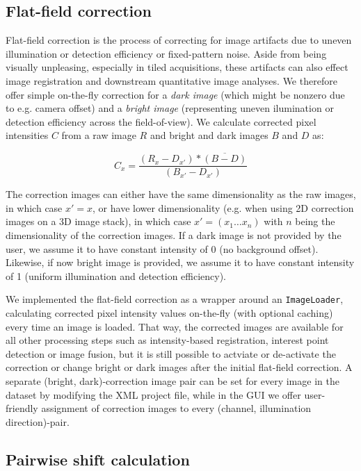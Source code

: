 \subsection{Flat-field correction}

Flat-field correction is the process of correcting for image artifacts due to uneven illumination or detection efficiency or fixed-pattern noise. Aside from being visually unpleasing, especially in tiled acquisitions, these artifacts can also effect image registration and downstream quantitative image analyses. We therefore offer simple on-the-fly correction for a \emph{dark image} (which might be nonzero due to e.g. camera offset) and a \emph{bright image} (representing uneven ilumination or detection efficiency across the field-of-view). We calculate corrected pixel intensities $C$ from a raw image $R$ and bright and dark images $B$ and $D$ as:

\begin{equation}
\label{eq:flatfield-eq1}
C_{x} = \frac{(R_{x} - D_{x'}) * \overline{(B-D)} }{(B_{x'}- D_{x'})}
\end{equation}

The correction images can either have the same dimensionality as the raw images, in which case $x' = x$, or have lower dimensionality (e.g. when using 2D correction images on a 3D image stack), in which case $x' = (x_1 \hdots x_n)$ with $n$ being the dimensionality of the correction images. If a dark image is not provided by the user, we assume it to have constant intensity of 0 (no background offset). Likewise, if now bright image is provided, we assume it to have constant intensity of 1 (uniform illumination and detection efficiency). 

We implemented the flat-field correction as a wrapper around an \texttt{ImageLoader}, calculating corrected pixel intensity values on-the-fly (with optional caching) every time an image is loaded. That way, the corrected images are available for all other processing steps such as intensity-based registration, interest point detection or image fusion, but it is still possible to actviate or de-activate the correction or change bright or dark images after the initial flat-field correction. A separate (bright, dark)-correction image pair can be set for every image in the dataset by modifying the XML project file, while in the GUI we offer user-friendly assignment of correction images to every (channel, illumination direction)-pair.

\subsection{Pairwise shift calculation}

